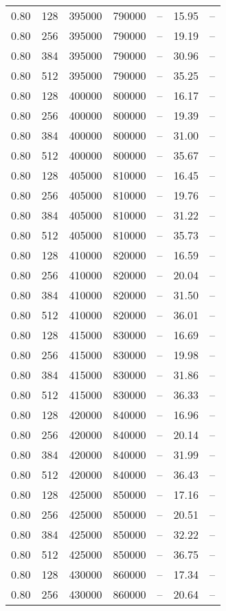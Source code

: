 \begin{tabular}{l|l|l|l|l|l|l}
0.80 & 128 & 395000 & 790000 & -- & 15.95 & --\\
0.80 & 256 & 395000 & 790000 & -- & 19.19 & --\\
0.80 & 384 & 395000 & 790000 & -- & 30.96 & --\\
0.80 & 512 & 395000 & 790000 & -- & 35.25 & --\\
0.80 & 128 & 400000 & 800000 & -- & 16.17 & --\\
0.80 & 256 & 400000 & 800000 & -- & 19.39 & --\\
0.80 & 384 & 400000 & 800000 & -- & 31.00 & --\\
0.80 & 512 & 400000 & 800000 & -- & 35.67 & --\\
0.80 & 128 & 405000 & 810000 & -- & 16.45 & --\\
0.80 & 256 & 405000 & 810000 & -- & 19.76 & --\\
0.80 & 384 & 405000 & 810000 & -- & 31.22 & --\\
0.80 & 512 & 405000 & 810000 & -- & 35.73 & --\\
0.80 & 128 & 410000 & 820000 & -- & 16.59 & --\\
0.80 & 256 & 410000 & 820000 & -- & 20.04 & --\\
0.80 & 384 & 410000 & 820000 & -- & 31.50 & --\\
0.80 & 512 & 410000 & 820000 & -- & 36.01 & --\\
0.80 & 128 & 415000 & 830000 & -- & 16.69 & --\\
0.80 & 256 & 415000 & 830000 & -- & 19.98 & --\\
0.80 & 384 & 415000 & 830000 & -- & 31.86 & --\\
0.80 & 512 & 415000 & 830000 & -- & 36.33 & --\\
0.80 & 128 & 420000 & 840000 & -- & 16.96 & --\\
0.80 & 256 & 420000 & 840000 & -- & 20.14 & --\\
0.80 & 384 & 420000 & 840000 & -- & 31.99 & --\\
0.80 & 512 & 420000 & 840000 & -- & 36.43 & --\\
0.80 & 128 & 425000 & 850000 & -- & 17.16 & --\\
0.80 & 256 & 425000 & 850000 & -- & 20.51 & --\\
0.80 & 384 & 425000 & 850000 & -- & 32.22 & --\\
0.80 & 512 & 425000 & 850000 & -- & 36.75 & --\\
0.80 & 128 & 430000 & 860000 & -- & 17.34 & --\\
0.80 & 256 & 430000 & 860000 & -- & 20.64 & --\\

\end{tabular}
